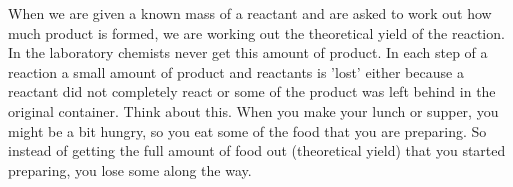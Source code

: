     \noindent
\label{m38712*eip-943}When we are given a known mass of a reactant and are asked to work out how much product is formed, we are working out the theoretical yield of the reaction. In the laboratory chemists never get this amount of product. In each step of a reaction a small amount of product and reactants is 'lost' either because a reactant did not completely react or some of the product was left behind in the original container. Think about this. When you make your lunch or supper, you might be a bit hungry, so you eat some of the food that you are preparing. So instead of getting the full amount of food out (theoretical yield) that you started preparing, you lose some along the way. \par \label{m38712*secfhsst!!!underscore!!!id2067}\vspace{.5cm} 
      \noindent
